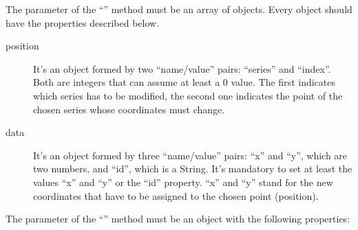 				The parameter of the “” method must be an array of objects. Every object should have the properties described below.
				\begin{description}
					\item[position] It's an object formed by two “name/value” pairs: “series” and “index”. Both are integers that can assume at least a 0 value. The first indicates which series has to be modified, the second one indicates the point of the chosen series whose coordinates must change. 
					\item[data] It's an object formed by three “name/value” pairs: “x” and “y”, which are two numbers, and “id”, which is a String. It's mandatory to set at least the values “x” and “y” or the “id” property. “x” and “y” stand for the new coordinates that have to be assigned to the chosen point (position).
				\end{description}
				The parameter of the “” method must be an object with the following properties:
